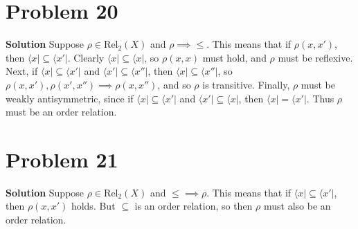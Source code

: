 \section{Problem 20}

\textbf{Solution } Suppose $\rho \in \text{Rel}_2(X)$ and $\rho \implies \leq$. This means that if $\rho(x, x')$, then $\langle x \rvert \subseteq \langle x' \rvert$. Clearly 
$\langle x \rvert \subseteq \langle x \rvert$, so $\rho(x, x)$ must hold, and $\rho$ must be reflexive. Next, if $\langle x \rvert \subseteq \langle x' \rvert$ and $\langle x' \rvert \subseteq \langle x'' \rvert$,
then $\langle x \rvert \subseteq \langle x'' \rvert$, so $\rho(x, x'), \rho(x', x'' ) \implies \rho(x, x'')$, and so $\rho$ is transitive. Finally, $\rho$ must be weakly antisymmetric, since if 
$\langle x \rvert \subseteq \langle x' \rvert$ and $\langle x' \rvert \subseteq \langle x \rvert$, then $\langle x \rvert = \langle x' \rvert$. Thus $\rho$ must be an order relation.


\section{Problem 21}

\textbf{Solution } Suppose $\rho \in \text{Rel}_2(X)$ and $\leq \implies \rho$. This means that if $\langle x \rvert \subseteq \langle x' \rvert$, then $\rho(x, x')$ holds. But $\subseteq$ is an
order relation, so then $\rho$ must also be an order relation.